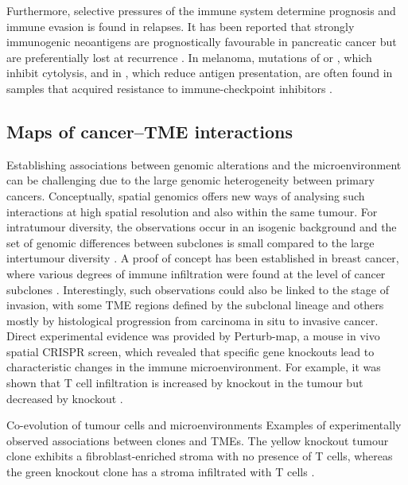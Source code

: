 Furthermore, selective pressures of the immune system determine prognosis and immune evasion is found in relapses. It has been reported that strongly immunogenic neoantigens are prognostically favourable in pancreatic cancer \parencite{Balachandran2017-zq} but are preferentially lost at recurrence \parencite{Luksza2022-jj}. In melanoma, mutations of  or , which inhibit cytolysis, and in , which reduce antigen presentation, are often found in samples that acquired resistance to immune-checkpoint inhibitors \parencite{Sade-Feldman2017-mj,Zaretsky2016-rs}.

\subsection*{Maps of cancer–\ac{TME} interactions}

Establishing associations between genomic alterations and the microenvironment can be challenging due to the large genomic heterogeneity between primary cancers. Conceptually, spatial genomics offers new ways of analysing such interactions at high spatial resolution and also within the same tumour. For intratumour diversity, the observations occur in an isogenic background and the set of genomic differences between subclones is small compared to the large intertumour diversity . A proof of concept has been established in breast cancer, where various degrees of immune infiltration were found at the level of cancer subclones \parencite{Lomakin2022-ks}. Interestingly, such observations could also be linked to the stage of invasion, with some \ac{TME} regions defined by the subclonal lineage and others mostly by histological progression from carcinoma in situ to invasive cancer. Direct experimental evidence was provided by Perturb-map, a mouse in vivo spatial CRISPR screen, which revealed that specific gene knockouts lead to characteristic changes in the immune microenvironment. For example, it was shown that T cell infiltration is increased by  knockout in the tumour but decreased by  knockout \parencite{Dhainaut2022-nj} .

    {Co-evolution of tumour cells and microenvironments \parencite{Seferbekova2023-wg}}
    {Examples of experimentally observed associations between clones and \ac{TME}s. The yellow  knockout tumour clone exhibits a fibroblast-enriched stroma with no presence of T cells, whereas the green  knockout clone has a stroma infiltrated with T cells \parencite{Dhainaut2022-nj}.}

